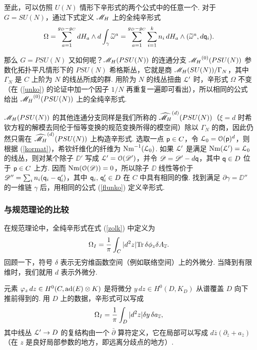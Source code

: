至此，可以仿照 $U(N)$ 情形下辛形式的两个公式中的任意一个. 对于 $G=SU(N)$，通过下式定义 $\MH$ 上的全纯辛形式
\begin{equation}\label{flunko}
\Omega=\sum_{a=1}^{g_D-g_C} dH_a\wedge d\int_\gamma\tilde
\omega^a=\sum_{a=1}^{g_D-g_C}\sum_{i=1}^kn_i \,dH_a \wedge
(\tilde\omega^a,d\qq_i).\end{equation}

那么 $G=PSU(N)$ 又如何呢？$\MH(PSU(N))$ 的连通分支 $\MH^{(0)}(PSU(N))$ 参数化拓扑平凡情形下的 $PSU(N)$ 希格斯丛，它就是商 $\MH(SU(N))/\Gamma_N$，其中 $\Gamma_N$ 是 $C$ 上阶为 $N$ 的线丛所成的群. 用阶为 $N$ 的线丛扭曲 ${\cal L}'$ 时，辛形式 $\Omega$ 不变（在 (\ref{unko}) 的论证中加一个因子 $1/N$ 再重复一遍即可看出），所以相同的公式给出 $\MH^{(0)}(PSU(N))$ 上的全纯辛形式.

$\MH(PSU(N))$ 的其他连通分支同样是我们所称的 $\hat\MH^{(d)}(PSU(N))$（$\xi=d$ 时希钦方程的解模去同伦于恒等变换的规范变换所得的模空间）除以 $\Gamma_N$ 的商，因此仍然只需在 $\hat\MH^{(d)}(PSU(N))$ 上构造辛形式. 选取一点 $\pp\in C$，令 ${\cal L}_0={\cal O}(\pp)^d$，则根据 (\ref{kormat})，希钦纤维化的纤维为 ${\rm Nm}^{-1}({\cal L}_0)$. 如果 ${\cal L}'$ 是满足 ${\rm Nm}({\cal L}')={\cal L}_0$ 的线丛，则对某个除子 ${\DD}'$ 写成 ${\cal L}'={\cal O}({\DD}')$，并令 ${\DD}=\DD'-d\qq$，其中 $\qq\in D$ 位于 $\pp\in C$ 上方. 因而 ${\rm Nm}(\O(\DD))=0$，所以除子 $\DD$ 线性等价于 $\DD''=\sum_in_i(\qq_i-\qq_i')$，其中 $\qq_i,\,\qq_i'\in D$ 在 $C$ 中具有相同的像. 找到满足 $\partial\gamma={\DD''}$ 的一维链 $\gamma$ 后，用相同的公式 (\ref{flunko}) 定义辛形式.

\subsubsection{与规范理论的比较}
\label{compgauge}

在规范理论中，全纯辛形式在式 (\ref{zolk}) 中定义为
\begin{equation}\label{zinto}\Omega_I={1\over\pi}\int_C|d^2z|\Tr\,\delta\phi_z
\delta A_{\bar z}.\end{equation} 回顾一下，符号 $\delta$ 表示无穷维函数空间（例如联络空间）上的外微分. 当降到有限维时，我们就用 $d$ 表示外微分.

元素 $\varphi_z \,dz\in H^0(C,\ad(E)\otimes K)$ 是将微分 $y\,dz\in H^0(D,K_D)$ 从谱覆盖 $D$ 向下推前得到的. 用 $D$ 上的数据，辛形式可以写成
\begin{equation}\label{minto}\Omega_I={1\over
\pi}\int_D|d^2z|\delta y\,\delta a_{\bar z},\end{equation} 其中线丛 ${\cal L}'\to D$ 的复结构由一个 $\bar\partial$ 算符定义，它在局部可以写成 $d\bar z(\partial_{\bar z}+a_{\bar z})$（在 $z$ 是良好局部参数的地方，即远离分歧点的地方）.

